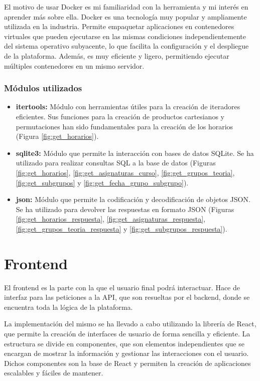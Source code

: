 El motivo de usar Docker es mi familiaridad con la herramienta y mi interés en aprender más sobre ella. Docker es una tecnología muy popular y ampliamente utilizada en la industria. Permite empaquetar aplicaciones en contenedores virtuales que pueden ejecutarse en las mismas condiciones independientemente del sistema operativo subyacente, lo que facilita la configuración y el despliegue de la plataforma. Además, es muy eficiente y ligero, permitiendo ejecutar múltiples contenedores en un mismo servidor.


\subsubsection*{Módulos utilizados}
\begin{itemize}
    \item \textbf{itertools:} Módulo con herramientas útiles para la creación de iteradores eficientes. Sus funciones para la creación de productos cartesianos y permutaciones han sido fundamentales para la creación de los horarios (Figura \ref{fig:get_horarios}).
    \item \textbf{sqlite3:} Módulo que permite la interacción con bases de datos SQLite. Se ha utilizado para realizar consultas SQL a la base de datos (Figuras \ref{fig:get_horarios}, \ref{fig:get_asignaturas_curso}, \ref{fig:get_grupos_teoria}, \ref{fig:get_subgrupos} y \ref{fig:get_fecha_grupo_subgrupo}).
    \item \textbf{json:} Módulo que permite la codificación y decodificación de objetos JSON. Se ha utilizado para devolver las respuestas en formato JSON (Figuras \ref{fig:get_horarios_respuesta}, \ref{fig:get_asignaturas_respuesta}, \ref{fig:get_grupos_teoria_respuesta} y \ref{fig:get_subgrupos_respuesta}).
\end{itemize}

\section{Frontend}

El frontend es la parte con la que el usuario final podrá interactuar. Hace de interfaz para las peticiones a la API, que son resueltas por el backend, donde se encuentra toda la lógica de la plataforma.\newline

La implementación del mismo se ha llevado a cabo utilizando la librería de React, que permite la creación de interfaces de usuario de forma sencilla y eficiente. La estructura se divide en componentes, que son elementos independientes que se encargan de mostrar la información y gestionar las interacciones con el usuario. Dichos componentes son la base de React y permiten la creación de aplicaciones escalables y fáciles de mantener.\newline


